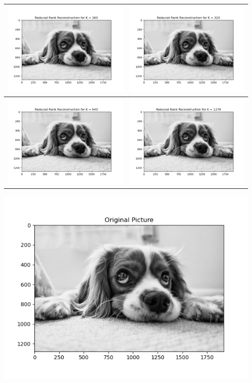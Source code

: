 \documentclass{article}
\begin{document}
\begin{enumerate}
\begin{center}
    \begin{tabular}{| c | c |}
    \hline
    \includegraphics[width=.40\textwidth]{Image_appn_100160.png} & \includegraphics[width=.40\textwidth]{Image_appn_100320.png} \\
    \hline
    \includegraphics[width=.40\textwidth]{Image_appn_100640.png} & \includegraphics[width=.40\textwidth]{Image_appn_101279.png} \\
    \hline
    \end{tabular}

    \includegraphics[width=.60\textwidth]{original.png}
\end{center}


\end{enumerate}
\end{document}
